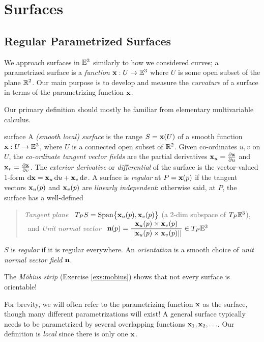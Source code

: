 \graphicspath{{surfaces/asy/}}

\section{Surfaces}\label{chap:surfaces}

\subsection{Regular Parametrized Surfaces}\label{sec:regularsurfaces}

We approach surfaces in $\E^3$ similarly to how we considered curves; a parametrized surface is a \emph{function} $\vx:U\to\E^3$ where $U$ is some open subset of the plane $\R^2$. Our main purpose is to develop and measure the \emph{curvature} of a surface in terms of the parametrizing function $\vx$.\medbreak


Our primary definition should mostly be familiar from elementary multivariable calculus.

\begin{defn}{}{surface}
	A \emph{(smooth local) surface} is the range $S=\vx(U)$ of a smooth function $\vx:U\to\E^3$, where $U$ is a connected open subset of $\R^2$.\smallbreak
	Given co-ordinates $u,v$ on $U$, the \emph{co-ordinate tangent vector fields} are the partial derivatives $\vx_u=\partials[\vx]{u}$ and $\vx_v=\partials[\vx]{v}$.\smallbreak
	The \emph{exterior derivative} or \emph{differential} of the surface is the vector-valued 1-form $\dvx=\vx_u\,\du+\vx_v\,\dv$.\smallbreak
	A surface is \emph{regular} at $P=\vx(p)$ if the tangent vectors $\vx_u(p)$ and $\vx_v(p)$ are \emph{linearly independent}: otherwise said, at $P$, the surface has a well-defined
	\begin{quote}
		\emph{Tangent plane} \ $T_PS=\Span\bigl\{\vx_u(p),\vx_v(p)\bigr\}$ (a 2-dim subspace of $T_P\E^3$), \ and \smallbreak
		\emph{Unit normal vector} \ $\vn(p)=\dfrac{\vx_u(p)\times\vx_v(p)}{\Nm{\vx_u(p)\times\vx_v(p)}} \in T_P\E^3$
	\end{quote}
	$S$ is \emph{regular} if it is regular everywhere. An \emph{orientation} is a smooth choice of \emph{unit normal vector field} $\vn$.
\end{defn}

The \emph{Möbius strip} (Exercise \ref{exs:mobius}) shows that not every surface is orientable!\par
For brevity, we will often refer to the parametrizing function $\vx$ as the surface, though many different parametrizations will exist! A general surface typically needs to be parametrized by several overlapping functions $\vx_1,\vx_2,\ldots$. Our definition is \emph{local} since there is only one $\vx$.


